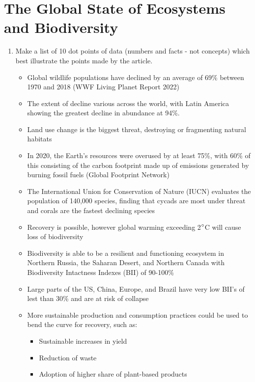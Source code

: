 \section{The Global State of Ecosystems and Biodiversity} \label{19/05/2025}
	\begin{enumerate}
		\item Make a list of 10 dot points of data (numbers and facts - not concepts) which best illustrate the points made by the article. 
			\begin{itemize}
				\item Global wildlife populations have declined by an average of 69\% between 1970 and 2018 (WWF Living Planet Report 2022)
				\item The extent of decline various across the world, with Latin America showing the greatest decline in abundance at 94\%.
					\item Land use change is the biggest threat, destroying or fragmenting natural habitats
				\item In 2020, the Earth's resources were overused by at least 75\%, with 60\% of this consisting of the carbon footprint made up of emissions generated by burning fossil fuels (Global Footprint Network)
				\item The International Union for Conservation of Nature (IUCN) evaluates the population of 140,000 species, finding that cycads are most under threat and corals are the fastest declining species
				\item Recovery is possible, however global warming exceeding 2$\degree$C will cause loss of biodiversity 
				\item Biodiversity is able to be a resilient and functioning ecosystem in Northern Russia, the Saharan Desert, and Northern Canada with Biodiversity Intactness Indexes (BII) of 90-100\%
				\item Large parts of the US, China, Europe, and Brazil have very low BII's of lest than 30\% and are at risk of collapse
				\item More sustainable production and consumption practices could be used to bend the curve for recovery, such as:
					\begin{itemize}
						\item Sustainable increases in yield
						\item Reduction of waste
						\item Adoption of higher share of plant-based products
					\end{itemize}
			\end{itemize}

\end{enumerate}
